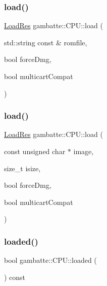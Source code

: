 \subsubsection{\texorpdfstring{load()}{load()}\hspace{0.1cm}{\footnotesize\ttfamily [1/2]}}
{\footnotesize\ttfamily \hyperlink{namespacegambatte_a42606f494711d2e2870a5f5cdf69e468}{Load\+Res} gambatte\+::\+C\+P\+U\+::load (\begin{DoxyParamCaption}\item[{std\+::string const \&}]{romfile,  }\item[{bool}]{force\+Dmg,  }\item[{bool}]{multicart\+Compat }\end{DoxyParamCaption})\hspace{0.3cm}{\ttfamily [inline]}}

\mbox{\label{classgambatte_1_1CPU_a722954e3155c839f2a63532f8c553540}} 
\subsubsection{\texorpdfstring{load()}{load()}\hspace{0.1cm}{\footnotesize\ttfamily [2/2]}}
{\footnotesize\ttfamily \hyperlink{namespacegambatte_a42606f494711d2e2870a5f5cdf69e468}{Load\+Res} gambatte\+::\+C\+P\+U\+::load (\begin{DoxyParamCaption}\item[{const unsigned char $\ast$}]{image,  }\item[{size\+\_\+t}]{isize,  }\item[{bool}]{force\+Dmg,  }\item[{bool}]{multicart\+Compat }\end{DoxyParamCaption})\hspace{0.3cm}{\ttfamily [inline]}}

\mbox{\label{classgambatte_1_1CPU_a20581262d956fd83bc9ff2ec7bf5f8c3}} 
\subsubsection{\texorpdfstring{loaded()}{loaded()}}
{\footnotesize\ttfamily bool gambatte\+::\+C\+P\+U\+::loaded (\begin{DoxyParamCaption}{ }\end{DoxyParamCaption}) const\hspace{0.3cm}{\ttfamily [inline]}}

